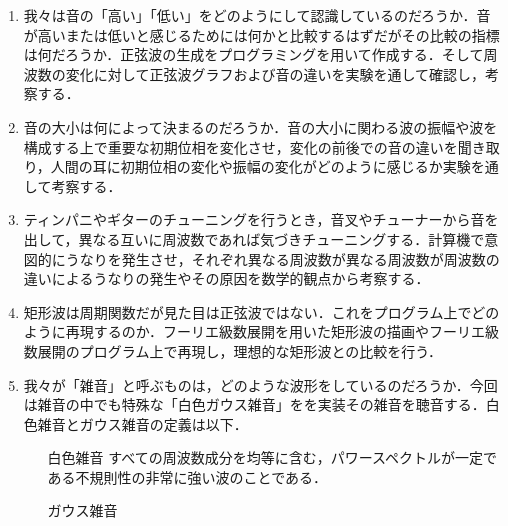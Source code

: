 \begin{enumerate}
	\item 我々は音の「高い」「低い」をどのようにして認識しているのだろうか．音が高いまたは低いと感じるためには何かと比較するはずだがその比較の指標は何だろうか．正弦波の生成をプログラミングを用いて作成する．そして周波数の変化に対して正弦波グラフおよび音の違いを実験を通して確認し，考察する．
	\item 音の大小は何によって決まるのだろうか．音の大小に関わる波の振幅や波を構成する上で重要な初期位相を変化させ，変化の前後での音の違いを聞き取り，人間の耳に初期位相の変化や振幅の変化がどのように感じるか実験を通して考察する．
	\item ティンパニやギターのチューニングを行うとき，音叉やチューナーから音を出して，異なる互いに周波数であれば気づきチューニングする．計算機で意図的にうなりを発生させ，それぞれ異なる周波数が異なる周波数が周波数の違いによるうなりの発生やその原因を数学的観点から考察する．
	\item 矩形波は周期関数だが見た目は正弦波ではない．これをプログラム上でどのように再現するのか．フーリエ級数展開を用いた矩形波の描画やフーリエ級数展開のプログラム上で再現し，理想的な矩形波との比較を行う．
	\item 我々が「雑音」と呼ぶものは，どのような波形をしているのだろうか．今回は雑音の中でも特殊な「白色ガウス雑音」をを実装その雑音を聴音する．白色雑音とガウス雑音の定義は以下．
	\begin{itemize}
		\item[白色雑音] すべての周波数成分を均等に含む，パワースペクトルが一定である不規則性の非常に強い波のことである．\cite{whitenoise}
		\item[ガウス雑音] 
	\end{itemize}
\end{enumerate}